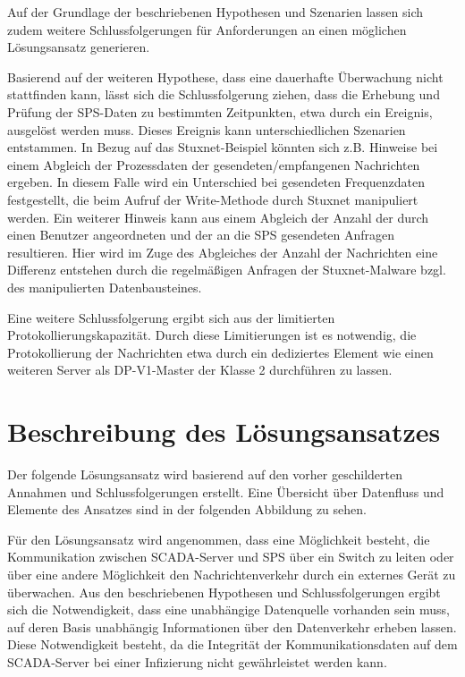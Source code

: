 Auf der Grundlage der beschriebenen Hypothesen und Szenarien lassen sich zudem weitere Schlussfolgerungen für Anforderungen an einen möglichen Lösungsansatz generieren. 

Basierend auf der weiteren Hypothese, dass eine dauerhafte Überwachung nicht stattfinden kann, lässt sich die Schlussfolgerung ziehen, dass die Erhebung und Prüfung der SPS-Daten zu bestimmten Zeitpunkten, etwa durch ein Ereignis, ausgelöst werden muss. Dieses Ereignis kann unterschiedlichen Szenarien entstammen. 
In Bezug auf das Stuxnet-Beispiel könnten sich z.B. Hinweise bei einem Abgleich der Prozessdaten der gesendeten/empfangenen Nachrichten ergeben. In diesem Falle wird ein Unterschied bei gesendeten Frequenzdaten festgestellt, die beim Aufruf der Write-Methode durch Stuxnet manipuliert werden. 
Ein weiterer Hinweis kann aus einem Abgleich der Anzahl der durch einen Benutzer angeordneten und der an die SPS gesendeten Anfragen resultieren. Hier wird im Zuge des Abgleiches der Anzahl der Nachrichten eine Differenz entstehen durch die regelmäßigen Anfragen der Stuxnet-Malware bzgl. des manipulierten Datenbausteines. 

Eine weitere Schlussfolgerung ergibt sich aus der limitierten Protokollierungskapazität. Durch diese Limitierungen ist es notwendig, die Protokollierung der Nachrichten etwa durch ein dediziertes Element wie einen weiteren Server als DP-V1-Master der Klasse 2 durchführen zu lassen. 

\section{Beschreibung des Lösungsansatzes}
Der folgende Lösungsansatz wird basierend auf den vorher geschilderten Annahmen und Schlussfolgerungen erstellt. Eine Übersicht über Datenfluss und Elemente des Ansatzes sind in der folgenden Abbildung zu sehen.

Für den Lösungsansatz wird angenommen, dass eine Möglichkeit besteht, die Kommunikation zwischen SCADA-Server und SPS über ein Switch zu leiten oder über eine andere Möglichkeit den Nachrichtenverkehr durch ein externes Gerät zu überwachen. Aus den beschriebenen Hypothesen und Schlussfolgerungen ergibt sich die Notwendigkeit, dass eine unabhängige Datenquelle vorhanden sein muss, auf deren Basis unabhängig Informationen über den Datenverkehr erheben lassen. Diese Notwendigkeit besteht, da die Integrität der Kommunikationsdaten auf dem SCADA-Server bei einer Infizierung nicht gewährleistet werden kann. 

